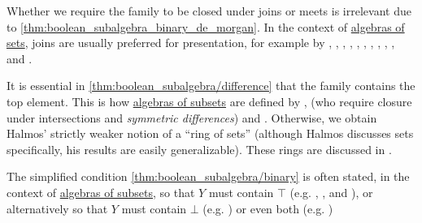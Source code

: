 \begin{comments}
  \item Whether we require the family to be closed under joins or meets is irrelevant due to \cref{thm:boolean_subalgebra_binary_de_morgan}. In the context of \hyperref[def:algebra_of_subsets]{algebras of sets}, joins are usually preferred for presentation, for example by
  \textcite[def. 3.1]{Драганов2022ТеорияНаМярката},
  \textcite[def. 4.9]{Jech2006SetTheory},
  \textcite[21]{Folland1999RealAnalysis},
  \textcite[2]{Çinlar2011ProbabilityAndStochastics},
  \textcite[def. 1.4.1]{Tao2011MeasureTheory},
  \textcite[\S 5.25]{Schechter1997AnalysisHandbook},
  \textcite[3]{Bobrowski2005FunctionalAnalysis},
  \textcite[2]{Malliavin1995IntegrationAndProbability},
  \textcite[294]{WheedenZygmund2015MeasureAndIntegral},
  \textcite[50]{КанторовичАкилов1984ФункциональныйАнализ},
  \textcite[def. 2.1]{Боровков1999ТеорияВероятностей} and
  \textcite[30]{Ширяев2007ВероятностьТом1}.

  \item It is essential in \cref{thm:boolean_subalgebra/difference} that the family contains the top element. This is how \hyperref[def:algebra_of_subsets]{algebras of subsets} are defined by
  \textcite[def. 1.2.1]{Богачёв2003ОсновыТеорииМерыТом1},
  \textcite[def. 1.2]{ДьяченкоУльянов1998МераИИнтеграл} (who require closure under intersections and \emph{symmetric differences}) and
  \textcite[30]{Ширяев2007ВероятностьТом1}.
  Otherwise, we obtain Halmos' strictly weaker notion of a \enquote{ring of sets} (although Halmos discusses sets specifically, his results are easily generalizable). These rings are discussed in \cite[ch. I]{Halmos1976MeasureTheory}.

  \item The simplified condition \cref{thm:boolean_subalgebra/binary} is often stated, in the context of \hyperref[def:algebra_of_subsets]{algebras of subsets}, so that \( Y \) must contain \( \top \) (e.g. \Textcite[def. 1.3]{Rudin1987RealAndComplexAnalysis}, \textcite[\S 5.25]{Schechter1997AnalysisHandbook}, \textcite[3]{Bobrowski2005FunctionalAnalysis} and \textcite[def. 2.1]{Боровков1999ТеорияВероятностей}), or alternatively so that \( Y \) must contain \( \bot \) (e.g. \Textcite[def. 1.4.1]{Tao2011MeasureTheory}) or even both (e.g. \Textcite[def. 1.1]{ДимитровЯнев2007ВероятностиИСтатистика})
\end{comments}
